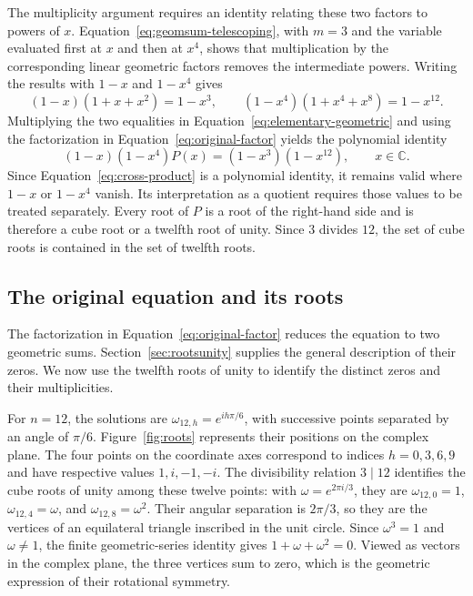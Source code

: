 \documentclass[11pt,a4paper]{article}
\numberwithin{equation}{section}
\theoremstyle{uprightpaper}
\newcommand{\C}{\mathbb{C}}
\begin{document}
The multiplicity argument requires an identity relating these two
factors to powers of $x$. Equation~\eqref{eq:geomsum-telescoping}, with
$m=3$ and the variable evaluated first at $x$ and then at $x^4$,
shows that multiplication by the corresponding linear geometric
factors removes the intermediate powers. Writing the results with
$1-x$ and $1-x^4$ gives
\begin{equation}\label{eq:elementary-geometric}
 (1-x)(1+x+x^2)=1-x^3,
 \qquad (1-x^4)(1+x^4+x^8)=1-x^{12}.
\end{equation}
Multiplying the two equalities in Equation~\eqref{eq:elementary-geometric}
and using the factorization in Equation~\eqref{eq:original-factor} yields
the polynomial identity
\begin{equation}\label{eq:cross-product}
 (1-x)(1-x^4)P(x)=(1-x^3)(1-x^{12}),
 \qquad x\in\C.
\end{equation}
Since Equation~\eqref{eq:cross-product} is a polynomial identity, it remains valid where $1-x$ or $1-x^4$ vanish. Its interpretation as a quotient requires those values to be treated separately. Every root of $P$ is a root of the right-hand side and is therefore a cube root or a twelfth root of unity. Since $3$ divides $12$, the set of cube roots is contained in the set of twelfth roots.

\subsection{The original equation and its roots}\label{sec:roots}

The factorization in Equation~\eqref{eq:original-factor} reduces the equation to two geometric sums. Section~\ref{sec:rootsunity} supplies the general description of their zeros. We now use the twelfth roots of unity to identify the distinct zeros and their multiplicities.

For $n=12$, the solutions are $\omega_{12,h}=e^{ih\pi/6}$, with successive points separated by an angle of $\pi/6$. Figure~\ref{fig:roots} represents their positions on the complex plane. The four points on the coordinate axes correspond to indices $h=0,3,6,9$ and have respective values $1, i,-1,-i$. The divisibility relation $3\mid12$ identifies the cube roots of unity among these twelve points: with $\omega=e^{2\pi i/3}$, they are $\omega_{12,0}=1$, $\omega_{12,4}=\omega$, and $\omega_{12,8}=\omega^2$. Their angular separation is $2\pi/3$, so they are the vertices of an equilateral triangle inscribed in the unit circle. Since $\omega^3=1$ and $\omega\ne1$, the finite geometric-series identity gives $1+\omega+\omega^2=0$. Viewed as vectors in the complex plane, the three vertices sum to zero, which is the geometric expression of their rotational symmetry.
\end{document}
